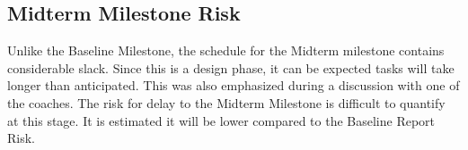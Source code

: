 \documentclass[a4paper]{report}
\begin{document}
\subsection{Midterm Milestone Risk}
Unlike the Baseline Milestone, the schedule for the Midterm milestone contains considerable slack. Since this is a design phase, it can be expected tasks will take longer than anticipated. This was also emphasized during a discussion with one of the coaches. 
\newline
The risk for delay to the Midterm Milestone is difficult to quantify at this stage. It is estimated it will be lower compared to the Baseline Report Risk. 
\end{document}
